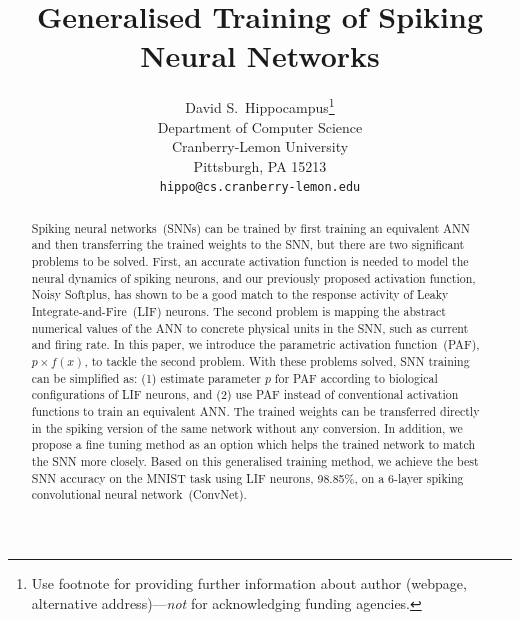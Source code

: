 \documentclass{article}
\title{Generalised Training of Spiking Neural Networks}
\author{
	David S.~Hippocampus\thanks{Use footnote for providing further
		information about author (webpage, alternative
		address)---\emph{not} for acknowledging funding agencies.} \\
	Department of Computer Science\\
	Cranberry-Lemon University\\
	Pittsburgh, PA 15213 \\
	\texttt{hippo@cs.cranberry-lemon.edu} \\
}
\begin{document}
	
	\maketitle
	
	\begin{abstract}
		Spiking neural networks~(SNNs) can be trained by first training an equivalent ANN and then transferring the trained weights to the SNN, but there are two significant problems to be solved.
		First, an accurate activation function is needed to model the neural dynamics of spiking neurons, and our previously proposed activation function, Noisy Softplus, has shown to be a good match to the response activity of Leaky Integrate-and-Fire~(LIF) neurons.
		The second problem is mapping the abstract numerical values of the ANN to concrete physical units in the SNN, such as current and firing rate.
		In this paper, we introduce the parametric activation function~(PAF), $p \times f(x)$, to tackle the second problem.
		With these problems solved, SNN training can be simplified as: (1) estimate parameter $p$ for PAF according to biological configurations of LIF neurons, and (2) use PAF instead of conventional activation functions to train an equivalent ANN.
		The trained weights can be transferred directly in the spiking version of the same network without any conversion.
		In addition, we propose a fine tuning method as an option which helps the trained network to match the SNN more closely.
		Based on this generalised training method, we achieve the best SNN accuracy on the MNIST task using LIF neurons, 98.85\%, on a 6-layer spiking convolutional neural network~(ConvNet).
		
		
		
		
	\end{abstract}
	
\end{document}
